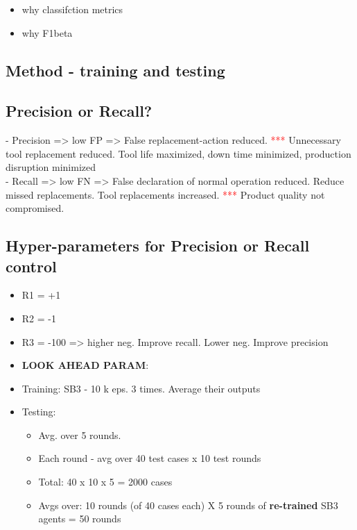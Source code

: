 \documentclass[a4paper, 12pt]{article}
\begin{document}
\begin{itemize}
	\item why classifction metrics
	\item why F1beta	
\end{itemize}

\subsection{Method - training and testing}
\subsection{Precision or Recall?}
- Precision => low FP => False replacement-action reduced. \textcolor{red}{***} Unnecessary tool replacement reduced. Tool life maximized, down time minimized, production disruption minimized \\
- Recall => low FN => False declaration of normal operation reduced. Reduce missed replacements. Tool replacements increased. \textcolor{red}{***} Product quality not compromised. 
\subsection{Hyper-parameters for Precision or Recall control}

\begin{itemize}
	\item R1 = +1 
	\item R2 = -1
	\item R3 = -100 => higher neg. Improve recall. Lower neg. Improve precision
	\item \textbf{LOOK AHEAD PARAM}: 
\end{itemize}

\begin{itemize}
	\item Training: SB3 - 10 k eps. 3 times. Average their outputs
	\item Testing: 
	\begin{itemize}
		\item Avg. over 5 rounds.
		\item Each round - avg over 40 test cases x 10 test rounds
		\item Total: 40 x 10 x 5 = 2000 cases
		\item Avgs over: 10 rounds (of 40 cases each) X 5 rounds of \textbf{re-trained} SB3 agents = 50 rounds 
	\end{itemize}
\end{itemize}
\end{document}
